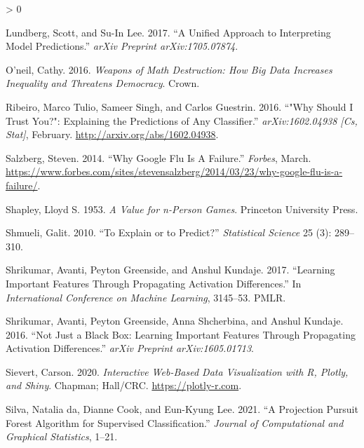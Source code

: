 \documentclass[
  article]{article}
\newlength{\cslhangindent}
\newenvironment{CSLReferences}[2] %
 {%
  \setlength{\parindent}{0pt}
  \ifodd #1 \everypar{\setlength{\hangindent}{\cslhangindent}}\ignorespaces\fi
  \ifnum #2 > 0
  \setlength{\parskip}{#2\baselineskip}
  \fi
 }%
 {}
\begin{document}
\begin{CSLReferences}{1}{0}
\leavevmode\hypertarget{ref-lundberg_unified_2017}{}%
Lundberg, Scott, and Su-In Lee. 2017. {``A Unified Approach to Interpreting Model Predictions.''} \emph{arXiv Preprint arXiv:1705.07874}.

\leavevmode\hypertarget{ref-oneil_weapons_2016}{}%
O'neil, Cathy. 2016. \emph{Weapons of Math Destruction: {How} Big Data Increases Inequality and Threatens Democracy}. Crown.

\leavevmode\hypertarget{ref-ribeiro_why_2016}{}%
Ribeiro, Marco Tulio, Sameer Singh, and Carlos Guestrin. 2016. {``"{Why} {Should} {I} {Trust} {You}?": {Explaining} the {Predictions} of {Any} {Classifier}.''} \emph{arXiv:1602.04938 {[}Cs, Stat{]}}, February. \url{http://arxiv.org/abs/1602.04938}.

\leavevmode\hypertarget{ref-salzberg_why_2014}{}%
Salzberg, Steven. 2014. {``Why {Google} {Flu} {Is} {A} {Failure}.''} \emph{Forbes}, March. \url{https://www.forbes.com/sites/stevensalzberg/2014/03/23/why-google-flu-is-a-failure/}.

\leavevmode\hypertarget{ref-shapley_value_1953}{}%
Shapley, Lloyd S. 1953. \emph{A Value for n-Person Games}. Princeton University Press.

\leavevmode\hypertarget{ref-shmueli_explain_2010}{}%
Shmueli, Galit. 2010. {``To Explain or to Predict?''} \emph{Statistical Science} 25 (3): 289--310.

\leavevmode\hypertarget{ref-shrikumar_learning_2017}{}%
Shrikumar, Avanti, Peyton Greenside, and Anshul Kundaje. 2017. {``Learning Important Features Through Propagating Activation Differences.''} In \emph{International {Conference} on {Machine} {Learning}}, 3145--53. PMLR.

\leavevmode\hypertarget{ref-shrikumar_not_2016}{}%
Shrikumar, Avanti, Peyton Greenside, Anna Shcherbina, and Anshul Kundaje. 2016. {``Not Just a Black Box: {Learning} Important Features Through Propagating Activation Differences.''} \emph{arXiv Preprint arXiv:1605.01713}.

\leavevmode\hypertarget{ref-sievert_interactive_2020}{}%
Sievert, Carson. 2020. \emph{Interactive {Web}-{Based} {Data} {Visualization} with {R}, Plotly, and Shiny}. Chapman; Hall/CRC. \url{https://plotly-r.com}.

\leavevmode\hypertarget{ref-da_silva_projection_2021}{}%
Silva, Natalia da, Dianne Cook, and Eun-Kyung Lee. 2021. {``A {Projection} {Pursuit} {Forest} {Algorithm} for {Supervised} {Classification}.''} \emph{Journal of Computational and Graphical Statistics}, 1--21.


\end{CSLReferences}
\end{document}
